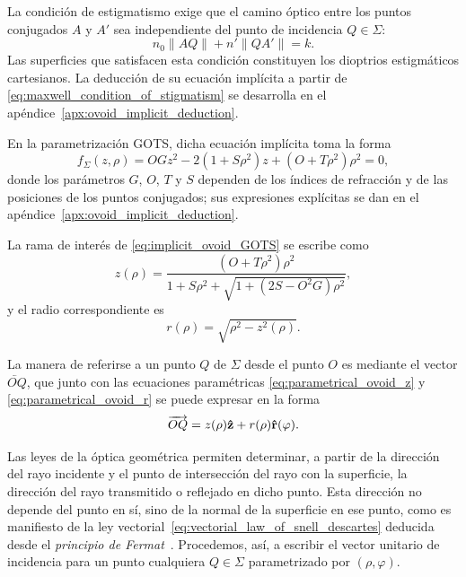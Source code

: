 La condición de estigmatismo exige que el camino óptico entre los puntos conjugados $A$ y $A'$ sea independiente del punto de incidencia $Q\in\Sigma$:
\begin{equation}
    n_0\lVert AQ\rVert + n'\lVert QA'\rVert = k.
    \label{eq:maxwell_condition_of_stigmatism}
\end{equation}
Las superficies que satisfacen esta condición constituyen los dioptrios estigmáticos cartesianos. La deducción de su ecuación implícita a partir de \eqref{eq:maxwell_condition_of_stigmatism} se desarrolla en el apéndice~\ref{apx:ovoid_implicit_deduction}.

En la parametrización GOTS, dicha ecuación implícita toma la forma
\begin{equation}
  f_{\Sigma}(z,\rho) = OGz^2 - 2(1 + S\rho^2)z + (O + T\rho^2)\rho^2 = 0,
  \label{eq:implicit_ovoid_GOTS}
\end{equation}
donde los parámetros $G$, $O$, $T$ y $S$ dependen de los índices de refracción y de las posiciones de los puntos conjugados; sus expresiones explícitas se dan en el apéndice~\ref{apx:ovoid_implicit_deduction}.

La rama de interés de \eqref{eq:implicit_ovoid_GOTS} se escribe como
\begin{equation}
  z(\rho) = \frac{(O + T\rho^2)\rho^2}{1 + S\rho^2 + \sqrt{1 + (2S - O^2G)\rho^2}},
  \label{eq:parametrical_ovoid_z}
\end{equation}
y el radio correspondiente es
\begin{equation}
  r(\rho) = \sqrt{\rho^2 - z^2(\rho)}.
  \label{eq:parametrical_ovoid_r}
\end{equation}

La manera de referirse a un punto $Q$ de $\Sigma$ desde el punto $O$ es mediante el vector $\lvec{OQ}$, que junto con las ecuaciones paramétricas \eqref{eq:parametrical_ovoid_z} y \eqref{eq:parametrical_ovoid_r} se puede expresar en la forma
\begin{equation}
  \overrightarrow{OQ} = z(\rho)\bm{\hat{\mathbf{z}}} + r(\rho)\bm{\hat{\mathbf{r}}}(\varphi).
  \label{eq:OQ_vector}
\end{equation}

Las leyes de la óptica geométrica permiten determinar, a partir de la dirección del rayo incidente y el punto de intersección del rayo con la superficie, la dirección del rayo transmitido o reflejado en dicho punto. Esta dirección no depende del punto en sí, sino de la normal de la superficie en ese punto, como es manifiesto de la ley vectorial~\eqref{eq:vectorial_law_of_snell_descartes} deducida desde el \emph{principio de Fermat}~\cite{bornwolf1999}. Procedemos, así, a escribir el vector unitario de incidencia para un punto cualquiera $Q \in \Sigma$ parametrizado por $(\rho, \varphi)$.

